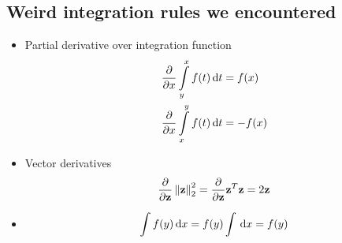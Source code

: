 \subsection{Weird integration rules we encountered}
\begin{itemize}
	\item
		Partial derivative over integration function
\begin{align*}
	\frac\partial{\partial x} \intop_y^x f(t) \id t &= f(x)\\
	\frac\partial{\partial x} \intop_x^y f(t) \id t &= -f(x)\\
\end{align*}
\item
	Vector derivatives
	\begin{align*}
		\frac\partial{\partial \mathbf{z}} \left \Vert \mathbf{z} \right \Vert^2_2 = \frac\partial{\partial \mathbf{z}} \mathbf{z}^T\mathbf{z} = 2\mathbf{z}
	\end{align*}
\item
	\begin{align*}
		\int f(y) \, \mathrm{d} x = f(y) \int \, \mathrm{d} x = f(y)
	\end{align*}
\end{itemize}
